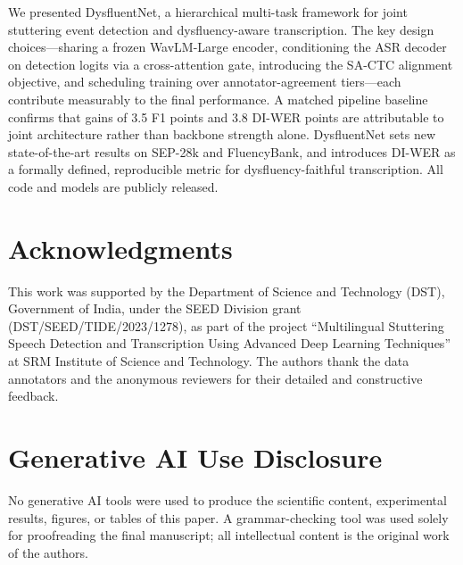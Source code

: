 \documentclass[cameraready]{Interspeech}
\begin{document}
We presented DysfluentNet, a hierarchical multi-task framework for joint
stuttering event detection and dysfluency-aware transcription. The key design
choices---sharing a frozen WavLM-Large encoder, conditioning the ASR decoder on
detection logits via a cross-attention gate, introducing the SA-CTC alignment
objective, and scheduling training over annotator-agreement tiers---each
contribute measurably to the final performance. A matched pipeline baseline
confirms that gains of 3.5 F1 points and 3.8 DI-WER points are attributable to
joint architecture rather than backbone strength alone. DysfluentNet sets new
state-of-the-art results on SEP-28k and FluencyBank, and introduces DI-WER as
a formally defined, reproducible metric for dysfluency-faithful transcription.
All code and models are publicly released.


\section{Acknowledgments}
This work was supported by the Department of Science and Technology (DST),
Government of India, under the SEED Division grant (DST/SEED/TIDE/2023/1278),
as part of the project ``Multilingual Stuttering Speech Detection and
Transcription Using Advanced Deep Learning Techniques'' at SRM Institute of
Science and Technology. The authors thank the data annotators and the anonymous
reviewers for their detailed and constructive feedback.

\section{Generative AI Use Disclosure}
No generative AI tools were used to produce the scientific content, experimental
results, figures, or tables of this paper. A grammar-checking tool was used
solely for proofreading the final manuscript; all intellectual content is the
original work of the authors.

\def\IEEEbibitemsep{0pt plus 0.5pt}


\end{document}
